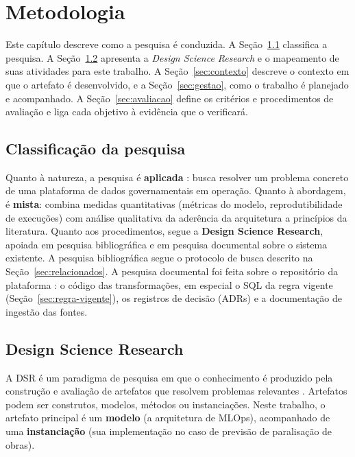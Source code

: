\chapter[Metodologia]{Metodologia}
\label{cap:metodologia}

Este capítulo descreve como a pesquisa é conduzida. A Seção~\ref{sec:classificacao} classifica a pesquisa. A Seção~\ref{sec:dsr} apresenta a \textit{Design Science Research} e o mapeamento de suas atividades para este trabalho. A Seção~\ref{sec:contexto} descreve o contexto em que o artefato é desenvolvido, e a Seção~\ref{sec:gestao}, como o trabalho é planejado e acompanhado. A Seção~\ref{sec:avaliacao} define os critérios e procedimentos de avaliação e liga cada objetivo à evidência que o verificará.

\section{Classificação da pesquisa}
\label{sec:classificacao}

Quanto à natureza, a pesquisa é \textbf{aplicada} \cite{gil2002}: busca resolver um problema concreto de uma plataforma de dados governamentais em operação. Quanto à abordagem, é \textbf{mista}: combina medidas quantitativas (métricas do modelo, reprodutibilidade de execuções) com análise qualitativa da aderência da arquitetura a princípios da literatura. Quanto aos procedimentos, segue a \textbf{Design Science Research}, apoiada em pesquisa bibliográfica e em pesquisa documental sobre o sistema existente. A pesquisa bibliográfica segue o protocolo de busca descrito na Seção~\ref{sec:relacionados}. A pesquisa documental foi feita sobre o repositório da plataforma \cite{govhubcidades}: o código das transformações, em especial o SQL da regra vigente (Seção~\ref{sec:regra-vigente}), os registros de decisão (ADRs) e a documentação de ingestão das fontes.

\section{Design Science Research}
\label{sec:dsr}

A DSR é um paradigma de pesquisa em que o conhecimento é produzido pela construção e avaliação de artefatos que resolvem problemas relevantes \cite{hevner2004}. Artefatos podem ser construtos, modelos, métodos ou instanciações. Neste trabalho, o artefato principal é um \textbf{modelo} (a arquitetura de MLOps), acompanhado de uma \textbf{instanciação} (sua implementação no caso de previsão de paralisação de obras).


